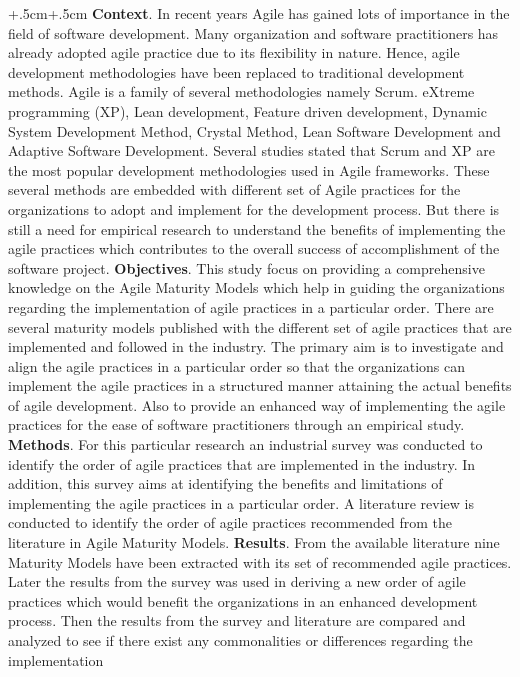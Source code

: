 \documentclass[a4paper,oneside]{bth}
\begin{document}
	\abstract
	\begin{changemargin}{+.5cm}{+.5cm}
		\noindent
\textbf{Context}. In recent years Agile has gained lots of importance in the field of software development. Many organization and software practitioners has already adopted agile practice due to its flexibility in nature. Hence, agile development methodologies have been replaced to traditional development methods. Agile is a family of several methodologies namely Scrum. eXtreme programming (XP), Lean development, Feature driven development, Dynamic System Development Method, Crystal Method, Lean Software Development and Adaptive Software Development. Several studies stated that Scrum and XP are the most popular development methodologies used in Agile frameworks. These several methods are embedded with different set of Agile practices for the organizations to adopt and implement for the development process. But there is still a need for empirical research to understand the benefits of implementing the agile practices which contributes to the overall success of accomplishment of the software project. \newline
\textbf{Objectives}. This study focus on providing a comprehensive knowledge on the Agile Maturity Models which help in guiding the organizations regarding the implementation of agile practices in a particular order. There are several maturity models published with the different set of agile practices that are implemented and followed in the industry. The primary aim is to investigate and align the agile practices in  a particular order so that the organizations can implement the agile practices in a structured manner attaining the actual benefits of agile development. Also to provide an enhanced way of implementing the agile practices for the ease of software practitioners through an empirical study.\newline
\textbf{Methods}. For this particular research an industrial survey was conducted to identify the order of agile practices that are implemented in the industry. In addition, this survey aims at identifying the benefits and limitations of implementing the agile practices in a particular order. A literature review is conducted to identify the order of agile practices recommended from the literature in Agile Maturity Models. \newline
\textbf{Results}. From the available literature nine Maturity Models have been extracted with its set of recommended agile practices. Later the results from the survey was used in deriving a new order of agile practices which would benefit the organizations in an enhanced development process. Then the results from the survey and literature are compared and analyzed to see if there exist any commonalities or differences regarding the implementation 

\end{changemargin}
\end{document}
